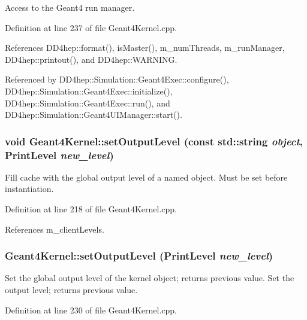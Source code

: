 Access to the Geant4 run manager. 

Definition at line 237 of file Geant4Kernel.cpp.

References DD4hep::format(), isMaster(), m\_\-numThreads, m\_\-runManager, DD4hep::printout(), and DD4hep::WARNING.

Referenced by DD4hep::Simulation::Geant4Exec::configure(), DD4hep::Simulation::Geant4Exec::initialize(), DD4hep::Simulation::Geant4Exec::run(), and DD4hep::Simulation::Geant4UIManager::start().\hypertarget{class_d_d4hep_1_1_simulation_1_1_geant4_kernel_aa2a86e9223fa508132a57669fab477d5}{
\subsubsection[{setOutputLevel}]{\setlength{\rightskip}{0pt plus 5cm}void Geant4Kernel::setOutputLevel (const std::string {\em object}, \/  {\bf PrintLevel} {\em new\_\-level})}}
\label{class_d_d4hep_1_1_simulation_1_1_geant4_kernel_aa2a86e9223fa508132a57669fab477d5}


Fill cache with the global output level of a named object. Must be set before instantiation. 

Definition at line 218 of file Geant4Kernel.cpp.

References m\_\-clientLevels.\hypertarget{class_d_d4hep_1_1_simulation_1_1_geant4_kernel_abf3fb3881f4e504ab8c4b14aa17ac7c8}{
\subsubsection[{setOutputLevel}]{ Geant4Kernel::setOutputLevel ({\bf PrintLevel} {\em new\_\-level})}}
\label{class_d_d4hep_1_1_simulation_1_1_geant4_kernel_abf3fb3881f4e504ab8c4b14aa17ac7c8}


Set the global output level of the kernel object; returns previous value. Set the output level; returns previous value. 

Definition at line 230 of file Geant4Kernel.cpp.

